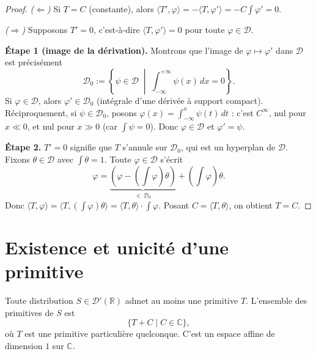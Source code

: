 \documentclass[12pt,a4paper,openany]{book}
\theoremstyle{definition}
\theoremstyle{plain}
\theoremstyle{remark}
\begin{document}
	\begin{proof}
		\emph{($\Leftarrow$)} Si $T = C$ (constante), alors $\langle T', \varphi\rangle = -\langle T, \varphi'\rangle = -C\int\varphi' = 0$.
		
		\emph{($\Rightarrow$)} Supposons $T' = 0$, c'est-à-dire $\langle T, \varphi'\rangle = 0$ pour toute $\varphi \in \mathcal{D}$.
		
		\textbf{Étape 1 (image de la dérivation).} Montrons que l'image de $\varphi \mapsto \varphi'$ dans $\mathcal{D}$ est précisément
		\[
		\mathcal{D}_0 := \left\{\psi \in \mathcal{D}\;\middle|\; \int_{-\infty}^{+\infty}\psi(x)\,dx = 0\right\}.
		\]
		Si $\varphi \in \mathcal{D}$, alors $\varphi' \in \mathcal{D}_0$ (intégrale d'une dérivée à support compact). Réciproquement, si $\psi \in \mathcal{D}_0$, posons $\varphi(x) = \int_{-\infty}^x\psi(t)\,dt$ : c'est $C^\infty$, nul pour $x \ll 0$, et nul pour $x \gg 0$ (car $\int\psi = 0$). Donc $\varphi \in \mathcal{D}$ et $\varphi' = \psi$.
		
		\textbf{Étape 2.} $T' = 0$ signifie que $T$ s'annule sur $\mathcal{D}_0$, qui est un hyperplan de $\mathcal{D}$.
		Fixons $\theta \in \mathcal{D}$ avec $\int\theta = 1$. Toute $\varphi \in \mathcal{D}$ s'écrit
		\[
		\varphi = \underbrace{\left(\varphi - \left(\int\varphi\right)\theta\right)}_{\in\,\mathcal{D}_0} + \left(\int\varphi\right)\theta.
		\]
		Donc $\langle T, \varphi\rangle = \langle T, (\int\varphi)\theta\rangle = \langle T, \theta\rangle \cdot \int\varphi$. Posant $C = \langle T, \theta\rangle$, on obtient $T = C$.
	\end{proof}
	
	\section{Existence et unicité d'une primitive}
	
	\begin{theorem}
		Toute distribution $S \in \mathcal{D}'(\mathbb{R})$ admet au moins une primitive $T$. L'ensemble des primitives de $S$ est
		\[
		\{T + C \mid C \in \mathbb{C}\},
		\]
		où $T$ est une primitive particulière quelconque. C'est un espace affine de dimension $1$ sur $\mathbb{C}$.
	\end{theorem}
	
\end{document}
